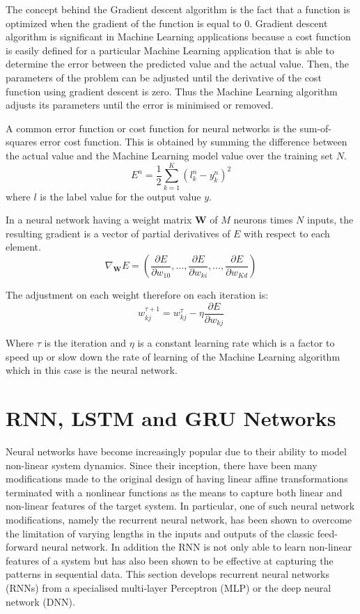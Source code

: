 The concept behind the Gradient descent algorithm is the fact that a function is optimized when the gradient of the function is equal to $0$.  Gradient descent algorithm is significant in Machine Learning applications because a cost function is easily defined for a particular Machine Learning application that is able to determine the error between the predicted value and the actual value.  Then, the parameters of the problem can be adjusted until the derivative of the cost function using gradient descent is zero.  Thus the Machine Learning algorithm adjusts its parameters until the error is minimised or removed.

A common error function or cost function for neural networks is the sum-of-squares error cost function.  This is obtained by summing the difference between the actual value and the Machine Learning model value over the training set $N$. 
\begin{equation}
E^n=\frac{1}{2}\sum_{k=1}^K(l_k^n-y_k^n)^2
\label{eqn_c3_nn_09}\end{equation}
where $l$ is the label value for the output value $y$.

In a neural network having a weight matrix $\mathbf{W}$ of $M$ neurons times $N$ inputs, the resulting gradient is a vector of partial derivatives of $E$ with respect to each element.  
\begin{equation}\nabla_{\mathbf{W}}E=\left(\frac{\partial E}{\partial w_{10}},\dots,\frac{\partial E}{\partial w_{ki}},\dots,\frac{\partial E}{\partial w_{Kd}}\right) 
\label{eqn_c3_nn_10}\end{equation}

The adjustment on each weight therefore on each iteration is:
\begin{equation}
w_{kj}^{\tau+1}=w_{kj}^{\tau}-\eta\frac{\partial E}{\partial w_{kj}}
\label{eqn_c3_nn_11}\end{equation}

Where $\tau$ is the iteration and $\eta$ is a constant learning rate which is a factor to speed up or slow down the rate of learning of the Machine Learning algorithm which in this case is the neural network.

\section{RNN, LSTM and GRU Networks}
Neural networks have become increasingly popular due to their ability to model non-linear system dynamics. Since their inception, there have been many modifications made to the original design of having linear affine transformations terminated with a nonlinear functions as the means to capture both linear and non-linear features of the target system. In particular, one of such neural network  modifications, namely the recurrent neural network, has been shown to overcome the limitation of varying lengths in the inputs and outputs of the classic feed-forward neural network.  In addition the RNN is not only able to learn non-linear features of a system but has also been shown to be effective at capturing the patterns in sequential data.  This section develops recurrent neural networks (RNNs) from a specialised multi-layer Perceptron (MLP) or the deep neural network (DNN).

